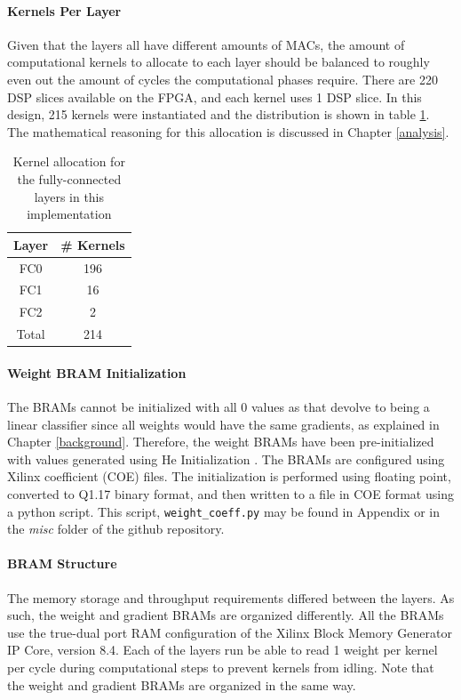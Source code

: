 \paragraph{Kernels Per Layer}
Given that the layers all have different amounts of MACs, the amount of computational kernels to allocate to each layer should be balanced to roughly even out the amount of cycles the computational phases require. There are 220 DSP slices available on the FPGA, and each kernel uses 1 DSP slice. In this design, 215 kernels were instantiated and the distribution is shown in table \ref{dsp-alloc}. The mathematical reasoning for this allocation is discussed in Chapter \ref{analysis}.
\begin{table}
	\centering
	\begin{tabular}{| c | c |}
		\hline
		\textbf{Layer} & \textbf{\# Kernels} \\\hline
		FC0 & 196 \\\hline 
		FC1 & 16 \\\hline 
		FC2 & 2 \\\hline	
		Total & 214 \\\hline	
	\end{tabular}
	\caption{Kernel allocation for the fully-connected layers in this implementation}
	\label{dsp-alloc}
\end{table}

\paragraph{Weight BRAM Initialization}
The BRAMs cannot be initialized with all 0 values as that devolve to being a linear classifier since all weights would have the same gradients, as explained in Chapter \ref{background}. Therefore, the weight BRAMs have been pre-initialized with values generated using He Initialization \cite{HeZR015}. The BRAMs are configured using Xilinx coefficient (COE) files. The initialization is performed using floating point, converted to Q1.17 binary format, and then written to a file in COE format using a python script. This script, \texttt{weight\_coeff.py} may be found in Appendix  or in the \textit{misc} folder of the github repository.

\paragraph{BRAM Structure}
The memory storage and throughput requirements differed between the layers. As such, the weight and gradient BRAMs are organized differently. All the BRAMs use the true-dual port RAM configuration of the Xilinx Block Memory Generator IP Core, version 8.4. Each of the layers run be able to read 1 weight per kernel per cycle during computational steps to prevent kernels from idling. Note that the weight and gradient BRAMs are organized in the same way.

